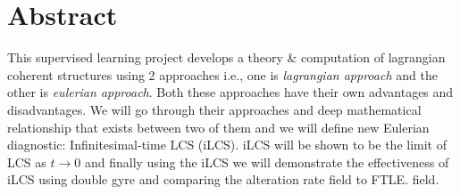 \documentclass[../report.tex]{subfiles}
\begin{document}
\chapter{Abstract}

This supervised learning project develops a theory \& computation of lagrangian coherent structures using 2 approaches i.e., one is \textit{lagrangian approach} and the other is \textit{eulerian approach}. Both these approaches have their own advantages and disadvantages. We will go through their approaches and deep mathematical relationship that exists between two of them and we will define new Eulerian diagnostic: Infinitesimal-time LCS (iLCS). iLCS will be shown to be the limit of LCS as \(t \rightarrow 0\) and finally using the iLCS we will demonstrate the effectiveness of iLCS using double gyre and comparing the alteration rate field to FTLE. field.
\end{document}
